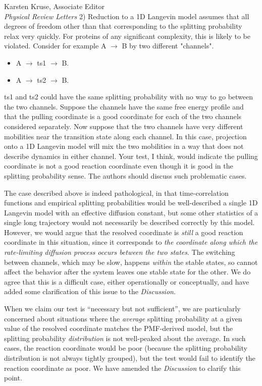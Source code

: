 \documentclass[ucb,qb3,10pt,fullfrom]{ucletter}
\begin{document}
\begin{letter}{Karsten Kruse, Associate Editor\\
\emph{Physical Review Letters}}
\color{magenta}
2) Reduction to a 1D Langevin model assumes that all degrees of
freedom other than that corresponding to the splitting probability
relax very quickly. For proteins of any significant complexity, this
is likely to be violated. Consider for example A $\rightarrow$ B by two different
"channels".
\begin{itemize}
\item A $\rightarrow$ ts1 $\rightarrow$ B.
\item A $\rightarrow$ ts2 $\rightarrow$ B.
\end{itemize}
ts1 and ts2 could have the same splitting probability with no way to
go between the two channels. Suppose the channels have the same free
energy profile and that the pulling coordinate is a good coordinate
for each of the two channels considered separately. Now suppose that
the two channels have very different mobilities near the transition
state along each channel. In this case, projection onto a 1D Langevin
model will mix the two mobilities in a way that does not describe
dynamics in either channel. Your test, I think, would indicate the
pulling coordinate is not a good reaction coordinate even though it is
good in the splitting probability sense. The authors should discuss
such problematic cases.

\color{black}
The case described above is indeed pathological, in that time-correlation functions and empirical splitting probabilities would be well-described a single 1D Langevin model with an effective diffusion constant, but some other statistics of a single long trajectory would not necessarily be described correctly by this model.
However, we would argue that the resolved coordinate is \emph{still} a good reaction coordinate in this situation, since it corresponds to \emph{the coordinate along which the rate-limiting diffusion process occurs between the two states}.
The switching between channels, which may be slow, happens \emph{within} the stable states, so cannot affect the behavior after the system leaves one stable state for the other.
We do agree that this is a difficult case, either operationally or conceptually, and have added some clarification of this issue to the \emph{Discussion}.

When we claim our test is ``necessary but not sufficient'', we are particularly concerned about situations where the \emph{average} splitting probability at a given value of the resolved coordinate matches the PMF-derived model, but the splitting probability \emph{distribution} is not well-peaked about the average.  
In such cases, the reaction coordinate would be poor (because the splitting probability distribution is not always tightly grouped), but the test would fail to identify the reaction coordinate as poor.
We have amended the \emph{Discussion} to clarify this point.


\end{letter}
\end{document}
